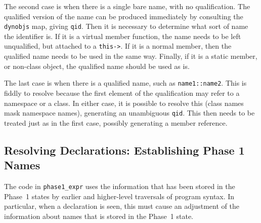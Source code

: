 \documentclass[11pt]{article}
\begin{document}
The second case is when there is a single bare name, with no
qualification.  The qualified version of the name can be produced
immediately by consulting the \texttt{dynobjs} map, giving
\texttt{qid}.  Then it is necessary to determine what sort of name the
identifier is.  If it is a virtual member function, the name needs to
be left unqualified, but attached to a \texttt{this->}.  If it is a
normal member, then the qualified name needs to be used in the same
way.  Finally, if it is a static member, or non-class object, the
qualified name should be used as is.

The last case is when there is a qualified name, such as
\texttt{name1::name2}.  This is fiddly to resolve because the first
element of the qualification may refer to a namespace or a class.  In
either case, it is possible to resolve this (class names mask
namespace names), generating an unambiguous \texttt{qid}.  This then
needs to be treated just as in the first case, possibly generating a
member reference.

\subsection{Resolving Declarations: Establishing Phase 1 Names}
The code in \texttt{phase1_expr} uses the information that has been
stored in the Phase~1 states by earlier and higher-level traversals of
program syntax.  In particular, when a declaration is seen, this must
cause an adjustment of the information about names that is stored in
the Phase~1 state.
\end{document}

